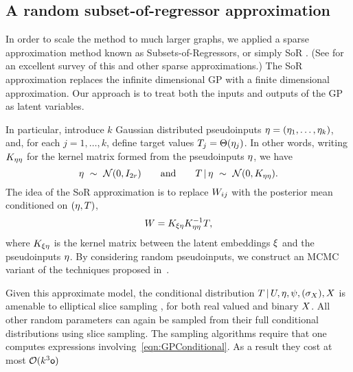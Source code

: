 \subsection{A random subset-of-regressor approximation}

In order to scale the method to much larger graphs, we applied a sparse approximation method known as Subsets-of-Regressors, or simply SoR \citep{Smola01,Wahba99,Silverman1985}. (See \citep{Quinonero-Candela:2005} for an excellent survey of this and other sparse approximations.)  The SoR approximation replaces the infinite dimensional GP with a finite dimensional approximation. Our approach is to treat both the inputs and outputs of the GP as latent variables.

In particular, 
introduce $k$ Gaussian distributed pseudoinputs $\eta=(\eta_1,\dotsc,\eta_k)$, and, for each $j=1,\dotsc,k$, define target values ${T_j = \Theta(\eta_j)}$.  In other words, writing $K_{\eta\eta}$ for the kernel matrix formed from the pseudoinputs $\eta$, we have
\[
\eta \ \sim\  \mathcal{N}(0,I_{2r}) \qquad\text{and}\qquad
T \,|\, \eta \ \sim\  \mathcal{N}(0,K_{\eta\eta}).
\]
The idea of the SoR approximation is to replace $W_{ij}$ with the posterior mean conditioned on $(\eta,T)$,
\[
W = K_{\xi\eta} K_{\eta\eta}^{-1}T,
\label{eqn:GPConditional}
\]
where $K_{\xi\eta}$ is the kernel matrix between the latent embeddings $\xi$ and the pseudoinputs $\eta$.  By considering random pseudoinputs, we construct an MCMC variant of the techniques proposed in~\cite{Titsias2008}.

Given this approximate model, the conditional distribution $T \,|\, U, \eta, \psi, (\sigma_X), X$ is amenable to elliptical slice sampling \citep{murray2010}, for both real valued and binary $X$. All other random parameters can again be sampled from their full conditional distributions using slice sampling.  The sampling algorithms require that one computes expressions involving~\eqref{eqn:GPConditional}. As a result they cost at most $\mathcal{O}(k^3 \mathsf o)$

